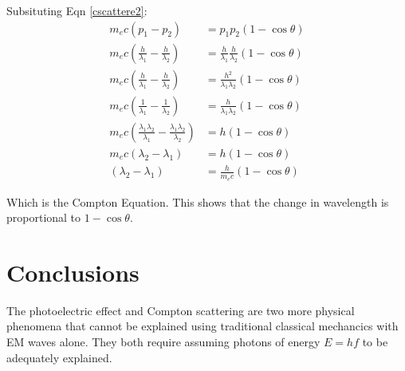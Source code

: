 Subsituting Eqn \ref{cscattere2}:
\begin{align*}
    m_ec(p_1 - p_2) &= p_1p_2 (1 - \cos \theta)\\
    m_ec\left(\frac{h}{\lambda_1} - \frac{h}{\lambda_2}\right) &= \frac{h}{\lambda_1} \frac{h}{\lambda_2} (1 - \cos \theta)\\
    m_ec\left(\frac{h}{\lambda_1} - \frac{h}{\lambda_2}\right) &= \frac{h^2}{\lambda_1 \lambda_2} (1 - \cos \theta)\\
    m_ec\left(\frac{1}{\lambda_1} - \frac{1}{\lambda_2}\right) &= \frac{h}{\lambda_1 \lambda_2} (1 - \cos \theta)\\
    m_ec\left(\frac{\lambda_1 \lambda_2}{\lambda_1} - \frac{\lambda_1 \lambda_2}{\lambda_2}\right) &= h (1 - \cos \theta)\\
    m_ec\left(\lambda_2 - \lambda_1\right) &= h (1 - \cos \theta)\\
    \left(\lambda_2 - \lambda_1\right) &= \frac{h}{m_ec} (1 - \cos \theta)
\end{align*}

Which is the Compton Equation. This shows that the change in wavelength is proportional to $1 - \cos \theta$.

\section*{Conclusions}
The photoelectric effect and Compton scattering are two more physical phenomena that cannot be explained using traditional classical mechancics with EM waves alone. They both require assuming photons of energy $E = hf$ to be adequately explained.